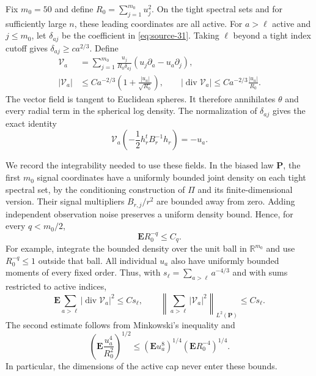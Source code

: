 Fix $m_0=50$ and define
$R_0=\sum_{j=1}^{m_0}u_j^2$.  On the tight spectral sets and for
sufficiently large $n$, these leading coordinates are all active.
For $a>\ell$ active and $j\leq m_0$, let $\delta_{aj}$ be the coefficient
in \eqref{eq:source-31}.  Taking $\ell$ beyond a tight index cutoff gives
$\delta_{aj}\geq c a^{2/3}$.  Define
\begin{equation}
 \begin{split}
 \mathcal V_a
 &=\sum_{j=1}^{m_0}\frac{u_j}{R_0\delta_{aj}}
       (u_j\partial_a-u_a\partial_j),\\
 |\mathcal V_a|
 &\leq Ca^{-2/3}\left(1+\frac{|u_a|}{\sqrt{R_0}}\right),\qquad
 |\operatorname{div}\mathcal V_a|
 \leq Ca^{-2/3}\frac{|u_a|}{R_0}.
 \end{split}
 \label{eq:source-42}
\end{equation}
The vector field is tangent to Euclidean spheres.  It therefore
annihilates $\theta$ and every radial term in the spherical log density.
The normalization of $\delta_{aj}$ gives the exact identity
\[
 \mathcal V_a\left(-\frac12h_r^tB_r^{-1}h_r\right)=-u_a.
\]

We record the integrability needed to use these fields.  In the biased
law $\mathbf P$, the first $m_0$ signal coordinates have a uniformly
bounded joint density on each tight spectral set, by the conditioning
construction of $\Pi$ and its finite-dimensional version.  Their signal
multipliers $B_{r,j}/r^2$ are bounded away from zero.  Adding independent
observation noise preserves a uniform density bound.  Hence, for every
$q<m_0/2$,
\[
 \mathbf E R_0^{-q}\leq C_q.
\]
For example, integrate the bounded density over the unit ball in
$\mathbb R^{m_0}$ and use $R_0^{-q}\leq1$ outside that ball.
All individual $u_a$ also have uniformly bounded moments of every
fixed order.  Thus, with
$s_\ell=\sum_{a>\ell}a^{-4/3}$ and with sums restricted to active indices,
\[
 \mathbf E\sum_{a>\ell}|\operatorname{div}\mathcal V_a|^2
 \leq Cs_\ell,
 \qquad
 \left\|\sum_{a>\ell}|\mathcal V_a|^2\right\|_{L^2(\mathbf P)}
 \leq Cs_\ell.
\]
The second estimate follows from Minkowski's inequality and
\[
 \left(\mathbf E\frac{u_a^4}{R_0^2}\right)^{1/2}
 \leq(\mathbf E u_a^8)^{1/4}
       (\mathbf E R_0^{-4})^{1/4}.
\]
In particular, the dimensions of the active cap never enter these
bounds.


